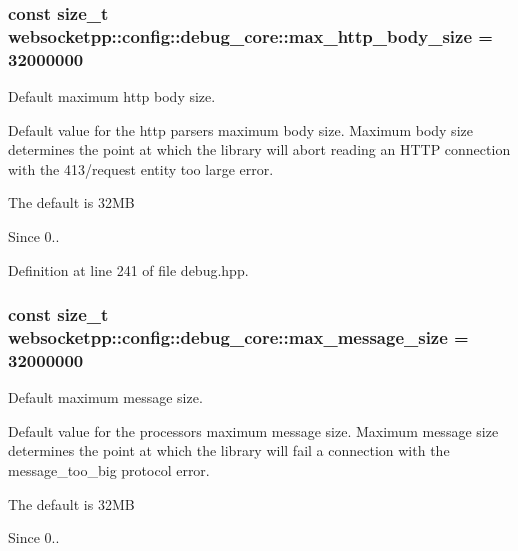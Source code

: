 \subsubsection[{max\+\_\+http\+\_\+body\+\_\+size}]{\setlength{\rightskip}{0pt plus 5cm}const size\+\_\+t websocketpp\+::config\+::debug\+\_\+core\+::max\+\_\+http\+\_\+body\+\_\+size = 32000000\hspace{0.3cm}{\ttfamily [static]}}\label{structwebsocketpp_1_1config_1_1debug__core_a95ea7d50bc0617bc447d98dca1ea7e0d}


Default maximum http body size. 

Default value for the http parser\textquotesingle{}s maximum body size. Maximum body size determines the point at which the library will abort reading an H\+T\+T\+P connection with the 413/request entity too large error.

The default is 32\+M\+B

\begin{DoxySince}{Since}
0.. 
\end{DoxySince}


Definition at line 241 of file debug.\+hpp.

\hypertarget{structwebsocketpp_1_1config_1_1debug__core_a2c46fa8d65f3a6a69ccec42bd0e91e20}{}
\subsubsection[{max\+\_\+message\+\_\+size}]{\setlength{\rightskip}{0pt plus 5cm}const size\+\_\+t websocketpp\+::config\+::debug\+\_\+core\+::max\+\_\+message\+\_\+size = 32000000\hspace{0.3cm}{\ttfamily [static]}}\label{structwebsocketpp_1_1config_1_1debug__core_a2c46fa8d65f3a6a69ccec42bd0e91e20}


Default maximum message size. 

Default value for the processor\textquotesingle{}s maximum message size. Maximum message size determines the point at which the library will fail a connection with the message\+\_\+too\+\_\+big protocol error.

The default is 32\+M\+B

\begin{DoxySince}{Since}
0.. 
\end{DoxySince}


